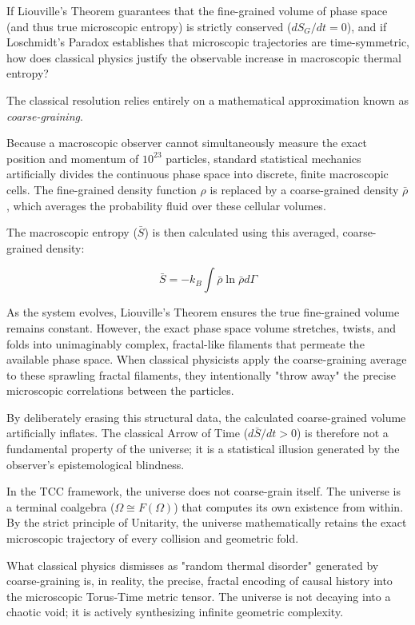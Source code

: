 \documentclass[12pt,openany]{book}
\theoremstyle{plain}
\theoremstyle{definition}
\theoremstyle{remark}
\begin{document}
If Liouville's Theorem guarantees that the fine-grained volume of phase space (and thus true microscopic entropy) is strictly conserved ($dS_G/dt = 0$), and if Loschmidt's Paradox establishes that microscopic trajectories are time-symmetric, how does classical physics justify the observable increase in macroscopic thermal entropy?

The classical resolution relies entirely on a mathematical approximation known as \textit{coarse-graining}.

Because a macroscopic observer cannot simultaneously measure the exact position and momentum of $10^{23}$ particles, standard statistical mechanics artificially divides the continuous phase space into discrete, finite macroscopic cells. The fine-grained density function $\rho$ is replaced by a coarse-grained density $\bar{\rho}$, which averages the probability fluid over these cellular volumes. 

The macroscopic entropy ($\bar{S}$) is then calculated using this averaged, coarse-grained density:

\begin{equation}
\bar{S} = -k_B \int \bar{\rho} \ln \bar{\rho} d\Gamma
\end{equation}

As the system evolves, Liouville's Theorem ensures the true fine-grained volume remains constant. However, the exact phase space volume stretches, twists, and folds into unimaginably complex, fractal-like filaments that permeate the available phase space. When classical physicists apply the coarse-graining average to these sprawling fractal filaments, they intentionally "throw away" the precise microscopic correlations between the particles. 

By deliberately erasing this structural data, the calculated coarse-grained volume artificially inflates. The classical Arrow of Time ($d\bar{S}/dt > 0$) is therefore not a fundamental property of the universe; it is a statistical illusion generated by the observer's epistemological blindness. 

In the TCC framework, the universe does not coarse-grain itself. The universe is a terminal coalgebra ($\Omega \cong F(\Omega)$) that computes its own existence from within. By the strict principle of Unitarity, the universe mathematically retains the exact microscopic trajectory of every collision and geometric fold. 

What classical physics dismisses as "random thermal disorder" generated by coarse-graining is, in reality, the precise, fractal encoding of causal history into the microscopic Torus-Time metric tensor. The universe is not decaying into a chaotic void; it is actively synthesizing infinite geometric complexity.
\end{document}
